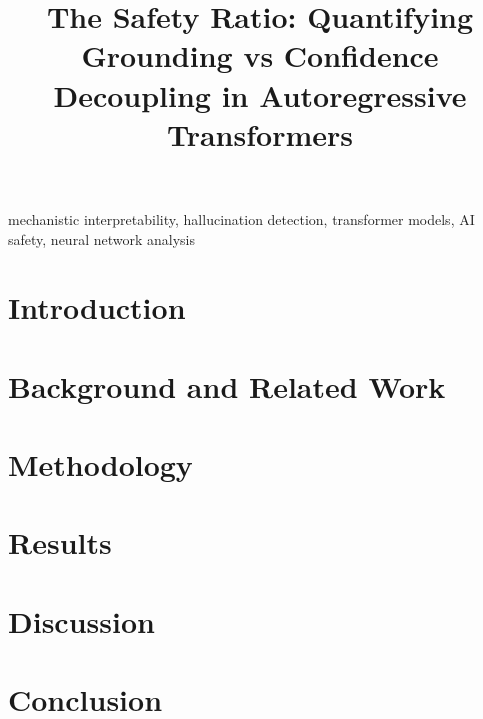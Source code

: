 \documentclass[conference]{IEEEtran}
\begin{document}
\title{The Safety Ratio: Quantifying Grounding vs Confidence Decoupling in Autoregressive Transformers}


\maketitle

\thispagestyle{empty}

\begin{abstract}

\end{abstract}

\begin{IEEEkeywords}
mechanistic interpretability, hallucination detection, transformer models, AI safety, neural network analysis
\end{IEEEkeywords}

\section{Introduction}


\section{Background and Related Work}


\section{Methodology}


\section{Results}


\section{Discussion}


\section{Conclusion}



\end{document}
